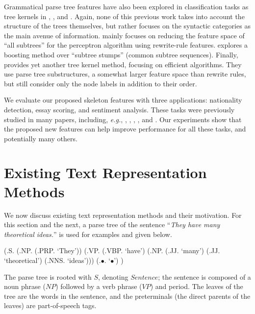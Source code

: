 \documentclass[conference]{IEEEtran}
\begin{document}
Grammatical parse tree features have also been explored in classification tasks
as tree kernels in \cite{acl-collins-2002}, \cite{emnlp-kudo-2004}, and
\cite{eacl-moschitti-2006}. Again, none of this previous work takes into account
the structure of the trees themselves, but rather focuses on the syntactic
categories as the main avenue of information. \cite{acl-collins-2002} mainly
focuses on reducing the feature space of ``all subtrees'' for the perceptron
algorithm using rewrite-rule features. \cite{emnlp-kudo-2004} explores a
boosting method over ``subtree stumps'' (common subtree sequences). Finally,
\cite{eacl-moschitti-2006} provides yet another tree kernel method, focusing on
efficient algorithms. They use parse tree substructures, a somewhat larger
feature space than rewrite rules, but still consider only the node labels in
addition to their order.

We evaluate our proposed skeleton features with three applications: nationality
detection, essay scoring, and sentiment analysis. These tasks were previously
studied in many papers, including, \emph{e.g.},
\cite{icassp-kamel-2010},    %
\cite{coling-burstein-1998}, \cite{shermis-2003},    %
\cite{ftir-pang-2008}, and \cite{esa-tang-2009}    %
. Our experiments show that the proposed new features can
help  improve performance for all these tasks, and potentially many others.  
 
\section{Existing Text Representation Methods}

We now discuss existing text representation methods and their motivation. For
this section and the next, a parse tree of the sentence ``\emph{They have many
theoretical ideas.}'' is used for examples and given below.

\begin{center}
\begin{parsetree}
  (.S. (.NP. (.PRP. `They')) (.VP. (.VBP. `have')
    (.NP. (.JJ. `many') (.JJ. `theoretical') (.NNS. `ideas')))
    (.$\bullet$. `$\bullet$') )
\end{parsetree}
\end{center}

The parse tree is rooted with $S$, denoting $Sentence$; the sentence is composed
of a noun phrase ($NP$) followed by a verb phrase ($VP$) and period. The leaves
of the tree are the words in the sentence, and the preterminals (the direct
parents of the leaves) are part-of-speech tags.
\end{document}
